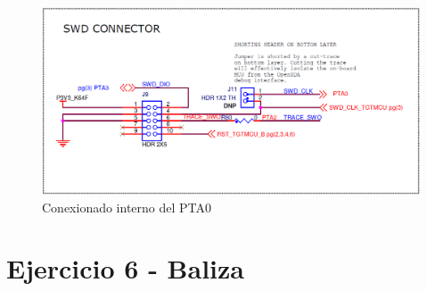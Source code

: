 \documentclass{article}
\begin{document}
\begin{figure}[ht]
	\centering
	\includegraphics[width=0.8 \textwidth]
	{../Imagenes/PTA0.png}
	\caption{Conexionado interno del PTA0}
	\label{fig:ej1}
\end{figure}

\newpage

\section*{Ejercicio 6 - Baliza}
\end{document}
